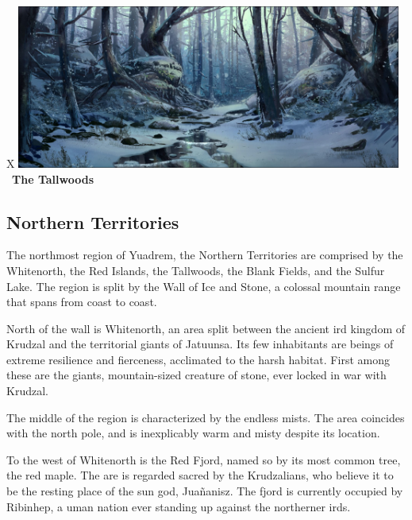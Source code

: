 
\begin{table}[b]%
    \begin{DndTable}[width=\linewidth]{X}
        \centering
        \includegraphics[width=0.95\textwidth]{01intro/img/11tallwoods.png} \
        \centering \large{\textbf{The Tallwoods}}
    \end{DndTable}
\end{table}

\subsection*{Northern Territories}
The northmost region of Yuadrem, the Northern Territories are comprised by the Whitenorth, the Red Islands, the Tallwoods, the Blank Fields, and the Sulfur Lake.
The region is split by the Wall of Ice and Stone, a colossal mountain range that spans from coast to coast.

North of the wall is Whitenorth, an area split between the ancient ird kingdom of Krudzal and the territorial giants of Jatuunsa.
Its few inhabitants are beings of extreme resilience and fierceness, acclimated to the harsh habitat.
First among these are the giants, mountain-sized creature of stone, ever locked in war with Krudzal.

The middle of the region is characterized by the endless mists.
The area coincides with the north pole, and is inexplicably warm and misty despite its location.

To the west of Whitenorth is the Red Fjord, named so by its most common tree, the red maple.
The are is regarded sacred by the Krudzalians, who believe it to be the resting place of the sun god, Jua\~nanisz.
The fjord is currently occupied by Ribinhep, a uman nation ever standing up against the northerner irds.

